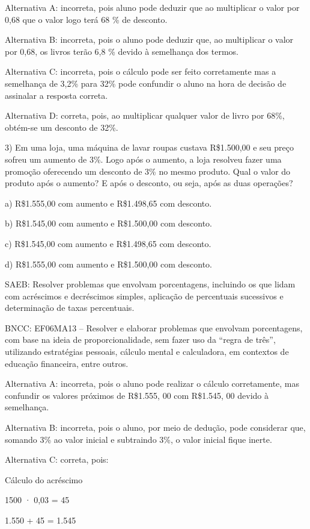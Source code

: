 Alternativa A: incorreta, pois aluno pode deduzir que ao multiplicar o
valor por 0,68 que o valor logo terá 68 \% de desconto.

Alternativa B: incorreta, pois o aluno pode deduzir que, ao multiplicar
o valor por 0,68, os livros terão 6,8 \% devido à semelhança dos termos.

Alternativa C: incorreta, pois o cálculo pode ser feito corretamente mas
a semelhança de 3,2\% para 32\% pode confundir o aluno na hora de
decisão de assinalar a resposta correta.

Alternativa D: correta, pois, ao multiplicar qualquer valor de livro por
68\%, obtém-se um desconto de 32\%.

3) Em uma loja, uma máquina de lavar roupas custava R\$1.500,00 e seu
preço sofreu um aumento de 3\%. Logo após o aumento, a loja resolveu
fazer uma promoção oferecendo um desconto de 3\% no mesmo produto. Qual
o valor do produto após o aumento? E após o desconto, ou seja, após as
duas operações?

a) R\$1.555,00 com aumento e R\$1.498,65 com desconto.

b) R\$1.545,00 com aumento e R\$1.500,00 com desconto.

c) R\$1.545,00 com aumento e R\$1.498,65 com desconto.

d) R\$1.555,00 com aumento e R\$1.500,00 com desconto.

SAEB: Resolver problemas que envolvam porcentagens, incluindo os que
lidam com acréscimos e decréscimos simples, aplicação de percentuais
sucessivos e determinação de taxas percentuais.

BNCC: EF06MA13 -- Resolver e elaborar problemas que envolvam
porcentagens, com base na ideia de proporcionalidade, sem fazer uso da
``regra de três'', utilizando estratégias pessoais, cálculo mental e
calculadora, em contextos de educação financeira, entre outros.

Alternativa A: incorreta, pois o aluno pode realizar o cálculo
corretamente, mas confundir os valores próximos de R\$1.555, 00 com
R\$1.545, 00 devido à semelhança.

Alternativa B: incorreta, pois o aluno, por meio de dedução, pode
considerar que, somando 3\% ao valor inicial e subtraindo 3\%, o valor
inicial fique inerte.

Alternativa C: correta, pois:

Cálculo do acréscimo

1500 · 0,03 = 45

1.550 + 45 = 1.545

